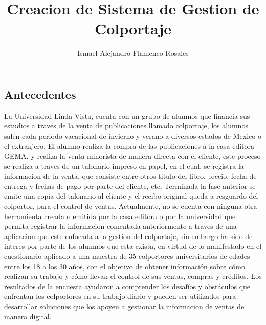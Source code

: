 \documentclass[runningheads]{llncs}
\begin{document}
\title{Creacion de Sistema de Gestion de Colportaje}
%
%
\author{Ismael Alejandro Flamenco Rosales}
%
%

\maketitle

\newpage

\section{}



\subsection{Antecedentes}
La Universidad Linda Vista, cuenta con un grupo de alumnos que financia sus estudios a traves de la venta de publicaciones llamado colportaje, los alumnos salen cada periodo vacacional de invierno y verano a diversos estados de Mexico o el extranjero. El alumno realiza la compra de las publicaciones a la casa editora GEMA, y realiza la venta minorista de manera directa con el cliente, este proceso se realiza a traves de un talonario impreso en papel, en el cual, se registra la informacion de la venta, que consiste entre otros titulo del libro, precio, fecha de entrega y fechas de pago por parte del cliente, etc. Terminada la fase anterior se emite una copia del talonario al cliente y el recibo original queda a resguardo del colportor, para el control de ventas.
Actualmente, no se cuenta con ninguna otra herramienta creada o emitida por la casa editora o por la universidad que permita registrar la informacion comentada anteriormente a traves de una aplicacion que este enfocada a la gestion del colportaje, sin embargo ha sido de interes por parte de los alumnos que esta exista, en virtud de lo manifestado en el cuestionario aplicado a una muestra de 35 colportores universitarios de edades entre los 18 a los 30 años, con el objetivo de obtener información sobre cómo realizan su trabajo y cómo llevan el control de sus ventas, compras y créditos. Los resultados de la encuesta ayudaron a comprender los desafíos y obstáculos que enfrentan los colportores en su trabajo diario y pueden ser utilizados para desarrollar soluciones que los apoyen a gestionar la informacion de ventas de manera digital.
\end{document}
